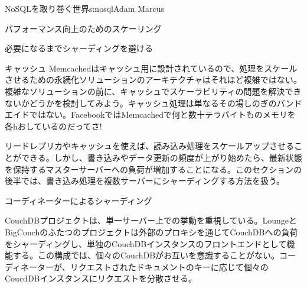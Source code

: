 \begin{aosachapter}{NoSQLを取り巻く世界}{s:nosql}{Adam Marcus}
\begin{aosasect1}{パフォーマンス向上のためのスケーリング}
\begin{aosasect2}{必要になるまでシャーディングを避ける}
\begin{aosasect3}{キャッシュ}
Memcachedはキャッシュ用に設計されているので、処理をスケールさせるための永続化ソリューションのアーキテクチャはそれほど複雑ではない。複雑なソリューションの前に、キャッシュでスケーラビリティの問題を解決できないかどうかを検討してみよう。キャッシュ処理は単なるその場しのぎのバンドエイドではない。FacebookではMemcachedで何と数十テラバイトものメモリを各hおしているのだってさ!

\end{aosasect3}

リードレプリカやキャッシュを使えば、読み込み処理をスケールアップさせることができる。しかし、書き込みやデータ更新の頻度が上がり始めたら、最新状態を保持するマスターサーバーへの負荷が増加することになる。このセクションの後半では、書き込み処理を複数サーバーにシャーディングする方法を扱う。

\end{aosasect2}

\begin{aosasect2}{コーディネーターによるシャーディング}

CouchDBプロジェクトは、単一サーバー上での挙動を重視している。LoungeとBigCouchのふたつのプロジェクトは外部のプロキシを通じてCouchDBへの負荷をシャーディングし、単独のCouchDBインスタンスのフロントエンドとして機能する。この構成では、個々のCouchDBがお互いを意識することがない。コーディネーターが、リクエストされたドキュメントのキーに応じて個々のCoucdDBインスタンスにリクエストを分散させる。


\end{aosasect2}
\end{aosasect1}
\end{aosachapter}
